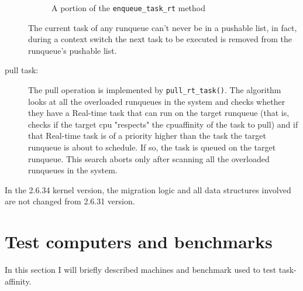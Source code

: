\begin{description}
\begin{figure}[h]
  \lstset{basicstyle=\footnotesize, language=c, captionpos=b, frame=single, label=lis:steps}
  
  \label{code:ttwu}
  \caption{A portion of the \texttt{enqueue\_task\_rt} method}
\end{figure}

The current task of any runqueue can't never be in a pushable list, in fact, during a context switch the next task to be executed is removed from the 
runqueue's pushable list.

\item[pull task:] The pull operation is implemented by \texttt{pull\_rt\_task()}. The algorithm looks at all the overloaded runqueues in the system 
and checks whether they have a Real-time task that can run on the target runqueue (that is, checks if the target cpu "respects" the cpuaffinity of the 
task to pull) and if that Real-time task is of a priority higher than the task the target runqueue is about to schedule. If so, the task is queued on 
the target runqueue. This search aborts only after scanning all the overloaded runqueues in the system. 

\end{description}

In the 2.6.34 kernel version, the migration logic and all data structures involved are not changed from 2.6.31 version.

\section{Test computers and benchmarks}

In this section I will briefly described machines and benchmark used to test task-affinity.

